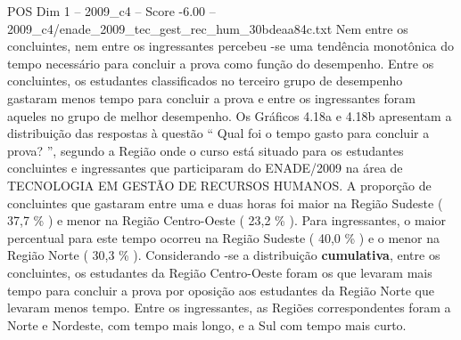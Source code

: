 \begin{textsample}{POS Dim 1 – 2009\_c4 – Score -6.00 – 2009\_c4/enade\_2009\_tec\_gest\_rec\_hum\_30bdeaa84c.txt}
Nem entre os concluintes, nem entre os ingressantes percebeu -se uma tendência monotônica do tempo necessário para concluir a prova como função do desempenho.
Entre os concluintes, os estudantes classificados no terceiro grupo de desempenho gastaram menos tempo para concluir a prova e entre os ingressantes foram aqueles no grupo de melhor desempenho.
Os Gráficos 4.18a e 4.18b apresentam a distribuição das respostas à questão “ Qual foi o tempo gasto para concluir a prova? ”, segundo a Região onde o curso está situado para os estudantes concluintes e ingressantes que participaram do ENADE/2009 na área de TECNOLOGIA EM GESTÃO DE RECURSOS HUMANOS.
A proporção de concluintes que gastaram entre uma e duas horas foi maior na Região Sudeste ( 37,7 \% ) e menor na Região Centro-Oeste ( 23,2 \% ).
Para ingressantes, o maior percentual para este tempo ocorreu na Região Sudeste ( 40,0 \% ) e o menor na Região Norte ( 30,3 \% ).
Considerando -se a distribuição \textbf{cumulativa}, entre os concluintes, os estudantes da Região Centro-Oeste foram os que levaram mais tempo para concluir a prova por oposição aos estudantes da Região Norte que levaram menos tempo.
Entre os ingressantes, as Regiões correspondentes foram a Norte e Nordeste, com tempo mais longo, e a Sul com tempo mais curto.

\end{textsample}
